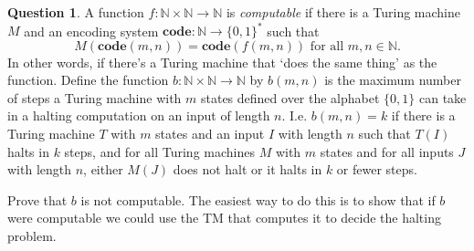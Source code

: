 \documentclass{article}
\theoremstyle{definition}
\newtheorem{Q}{Question}
\newcommand{\co}{\mathbf{code}}
\begin{document}
\begin{Q}
A function $f:\mathbb{N}\times\mathbb{N}\to\mathbb{N}$ is \emph{computable} if there is a Turing machine $M$ and an encoding system $\co:\mathbb{N}\to \{0,1\}^*$ such that \[M(\co(m,n))=\co(f(m,n))\text{ for all }m,n\in \mathbb{N}.\] 
In other words, if there's a Turing machine that `does the same thing' as the function. Define the function $b:\mathbb{N}\times\mathbb{N}\to\mathbb{N}$ by $b(m,n)$ is the maximum number of steps a Turing machine with $m$ states defined over the alphabet $\{0,1\}$ can take in a halting computation on an input of length $n$. I.e. $b(m,n)=k$ if there is a Turing machine $T$ with $m$ states and an input $I$ with length $n$ such that $T(I)$ halts in $k$ steps, and for all Turing machines $M$ with $m$ states and for all inputs $J$ with length $n$, either $M(J)$ does not halt or it halts in $k$ or fewer steps. 

Prove that $b$ is not computable. The easiest way to do this is to show that if $b$ were computable we could use the TM that computes it to decide the halting problem. 
 
\end{Q}
\begin{comment}
\textbf{Solution} \\
Suppose $b$ is computable. Consider the following algorithm on input $\co(T,I)$:
\begin{enumerate}
\item Count the number of states of $T$. Call this $x$.
\item Calculate the length of $I$. Call this $y$.
\item Compute $b(x,y)$.
\item Simulate $T(I)$ while keeping track of number of simulated computation steps. If $T(I)$ halts within $b(x,y)$ steps then accept. If simulation passes $b(x,y)$ steps then we can reject, as we know $T(I)$ cannot halt after this point, by definition of $b$.
\end{enumerate}

The above algorithm would solve the halting problem, which we know is impossible, so $b$ cannot be computable.
\end{comment}
\end{document}
